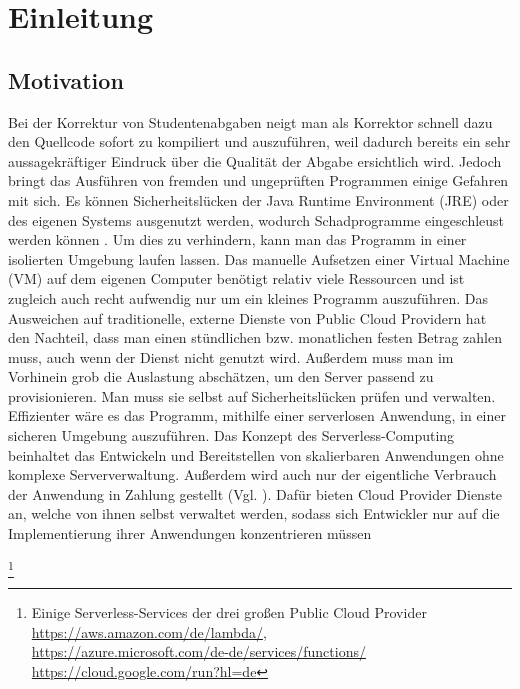 \chapter{Einleitung}

\section{Motivation}

Bei der Korrektur von Studentenabgaben neigt man als Korrektor schnell dazu den Quellcode
sofort zu kompiliert und auszuführen, weil dadurch bereits ein sehr aussagekräftiger Eindruck
über die Qualität der Abgabe ersichtlich wird. Jedoch bringt das Ausführen von fremden und ungeprüften Programmen einige Gefahren mit sich.
Es können Sicherheitslücken der Java Runtime Environment (JRE) \cite{Jre}
oder des eigenen Systems ausgenutzt werden, wodurch Schadprogramme eingeschleust
werden können \cite{CveJreVuln}.
Um dies zu verhindern, kann man das Programm in einer isolierten Umgebung laufen lassen.
Das manuelle Aufsetzen einer Virtual Machine (VM) auf dem eigenen Computer benötigt relativ
viele Ressourcen und ist zugleich auch recht aufwendig nur um ein kleines Programm auszuführen.
Das Ausweichen auf traditionelle, externe Dienste von Public Cloud Providern hat den Nachteil,
dass man einen stündlichen bzw. monatlichen festen Betrag zahlen muss,
auch wenn der Dienst nicht genutzt wird. Außerdem muss man im Vorhinein grob die Auslastung
abschätzen, um den Server passend zu provisionieren.
Man muss sie selbst auf Sicherheitslücken prüfen und verwalten.
Effizienter wäre es das Programm, mithilfe einer serverlosen Anwendung, in einer sicheren Umgebung auszuführen.
Das Konzept des Serverless-Computing beinhaltet das Entwickeln und Bereitstellen
von skalierbaren Anwendungen ohne komplexe Serververwaltung.
Außerdem wird auch nur der eigentliche Verbrauch der Anwendung in Zahlung gestellt (Vgl. \cite{CioGov}).
Dafür bieten Cloud Provider Dienste an, welche von ihnen selbst verwaltet werden,
sodass sich Entwickler nur auf die Implementierung ihrer Anwendungen konzentrieren müssen

\footnote{
  Einige Serverless-Services der drei großen Public Cloud Provider\\
  {\url{https://aws.amazon.com/de/lambda/}},\\
  {\url{https://azure.microsoft.com/de-de/services/functions/}}\\
  {\url{https://cloud.google.com/run?hl=de}}
}

